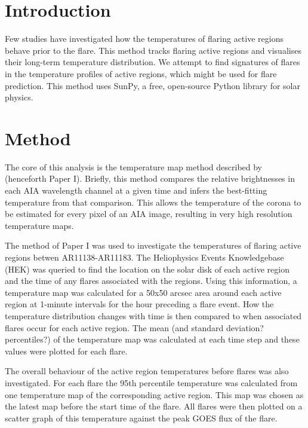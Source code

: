\documentclass{article}
\begin{document}
\section{Introduction}
Few studies have investigated how the temperatures of flaring active regions behave prior to the flare.
This method tracks flaring active regions and visualises their long-term temperature distribution.
We attempt to find signatures of flares in the temperature profiles of active regions, which might be used for flare prediction.
This method uses SunPy, a free, open-source Python library for solar physics.

\section{Method}
The core of this analysis is the temperature map method described by \cite{Leonard2014} (henceforth Paper I).
Briefly, this method compares the relative brightnesses in each AIA wavelength channel at a given time and infers the best-fitting temperature from that comparison.
This allows the temperature of the corona to be estimated for every pixel of an AIA image, resulting in very high resolution temperature maps.

The method of Paper I was used to investigate the temperatures of flaring active regions betwen AR11138-AR11183. %
The Heliophysics Events Knowledgebase (HEK) was queried to find the location on the solar disk of each active region and the time of any flares associated with the regions.
Using this information, a temperature map was calculated for a 50x50 arcsec area around each active region at 1-minute intervals for the hour preceding a flare event.
How the temperature distribution changes with time is then compared to when associated flares occur for each active region.
The mean (and standard deviation? percentiles?) of the temperature map was calculated at each time step and these values were plotted for each flare.

The overall behaviour of the active  region temperatures before flares was also investigated.
For each flare the 95th percentile temperature was calculated from one temperature map of the corresponding active region.
This map was chosen as the latest map before the start time of the flare. %
All flares were then plotted on a scatter graph of this temperature against the peak GOES flux of the flare.
\end{document}
